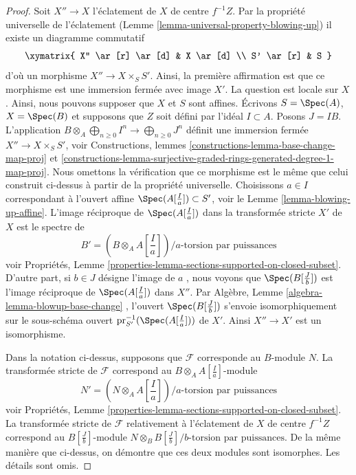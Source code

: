 \begin{proof}
Soit  $X'' \to X$  l'éclatement de  $X$  de centre  $f^{-1}Z$. Par la propriété
universelle de l'éclatement (Lemme  \ref{lemma-universal-property-blowing-up}) il existe un diagramme commutatif
$$
\xymatrix{
X'' \ar[r] \ar[d] & X \ar[d] \\
S' \ar[r] & S
}
$$
d'où un morphisme  $X'' \to X \times_S S'$. Ainsi, la première affirmation est que ce
morphisme est une immersion fermée avec image  $X'$. La question est locale
sur  $X$. Ainsi, nous pouvons supposer que  $X$  et  $S$ 
sont affines. Écrivons  $S = \Spec(A)$,  $X = \Spec(B)$ et supposons que  $Z$  soit défini
par l'idéal  $I \subset A$. Posons  $J = IB$. L'application  $B \otimes_A \bigoplus_{n \geq 0} I^n \to \bigoplus_{n \geq 0} J^n$  définit
une immersion fermée  $X'' \to X \times_S S'$, voir Constructions, lemmes  \ref{constructions-lemma-base-change-map-proj}  et
 \ref{constructions-lemma-surjective-graded-rings-generated-degree-1-map-proj}. Nous omettons la vérification que ce morphisme est le même que celui
construit ci-dessus à partir de la propriété universelle. Choisissons  $a \in I$ 
correspondant à l'ouvert affine  $\Spec(A[\frac{I}{a}]) \subset S'$, voir le Lemme  \ref{lemma-blowing-up-affine}. L'image
réciproque de  $\Spec(A[\frac{I}{a}])$  dans la transformée stricte  $X'$  de
 $X$  est le spectre de
$$
B' = (B \otimes_A A[\textstyle{\frac{I}{a}}])/a\text{-torsion par puissances}
$$
voir Propriétés, Lemme  \ref{properties-lemma-sections-supported-on-closed-subset}. D'autre part, si  $b \in J$  désigne
l'image de  $a$ , nous voyons que  $\Spec(B[\frac{J}{b}])$  est l'image réciproque de
 $\Spec(A[\frac{I}{a}])$  dans  $X''$. Par Algèbre, Lemme  \ref{algebra-lemma-blowup-base-change} , l'ouvert
 $\Spec(B[\frac{J}{b}])$  s'envoie isomorphiquement sur le sous-schéma ouvert  $\text{pr}_{S'}^{-1}(\Spec(A[\frac{I}{a}]))$  de
 $X'$. Ainsi  $X'' \to X'$  est un isomorphisme.

\medskip\noindent
Dans la notation ci-dessus, supposons que  $\mathcal{F}$  corresponde au  $B$-module
 $N$. La transformée stricte de  $\mathcal{F}$  correspond au
 $B \otimes_A A[\frac{I}{a}]$-module
$$
N' = (N \otimes_A A[\textstyle{\frac{I}{a}}])/a\text{-torsion par puissances}
$$
voir Propriétés, Lemme  \ref{properties-lemma-sections-supported-on-closed-subset}. La transformée stricte de  $\mathcal{F}$ 
relativement à l'éclatement de  $X$  de centre  $f^{-1}Z$  correspond au
 $B[\frac{J}{b}]$-module  $N \otimes_B B[\frac{J}{b}]/b\text{-torsion par puissances}$. De la même manière que ci-dessus, on
démontre que ces deux modules sont isomorphes. Les détails sont omis.
\end{proof}

